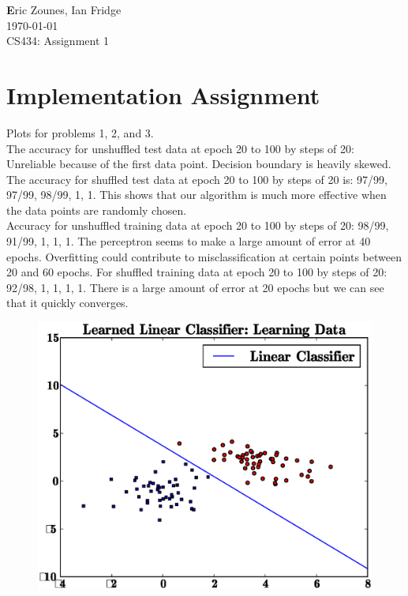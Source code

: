 \documentclass[letterpaper,10pt,titlepage]{article}
\begin{document}
\begin{flushright}
\end{flushright}
\begin{flushleft}
\textbf Eric Zounes, Ian Fridge \\
\today  \\
CS434: Assignment 1 
\end{flushleft}
\section[1]{Implementation Assignment} 
\large Plots for problems 1, 2, and 3. \\ 

The accuracy for unshuffled test data at epoch 20 to 100 by steps of 20: Unreliable because of the first data point. Decision boundary is heavily skewed. The accuracy for shuffled test data  at epoch 20 to 100 by steps of 20 is: 97/99, 97/99, 98/99, 1, 1. This shows that our algorithm is much more effective when the data points are randomly chosen. \\
Accuracy for unshuffled training data at epoch 20 to 100 by steps of 20: 98/99, 91/99, 1, 1, 1. The perceptron seems to make a large amount of error at 40 epochs. Overfitting could contribute to misclassification at certain points between 20 and 60 epochs. For shuffled training data at epoch 20 to 100 by steps of 20: 92/98, 1, 1, 1, 1. There is a large amount of error at 20 epochs but we can see that it quickly converges. 
\begin{figure}[th!]
\centering
\includegraphics[width=5in]{learn.eps} 
\end{figure} 
\end{document}
